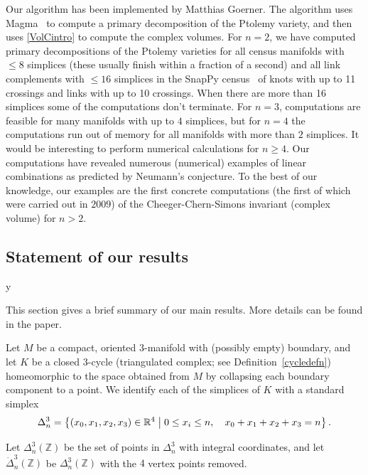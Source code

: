 \documentclass[11pt]{amsart}
\theoremstyle{definition}
\numberwithin{equation}{section}
\def\printname#1{
        \if\draft y
                \smash{\makebox[0pt]{\hspace{-0.5in}
                        \raisebox{8pt}{\tt\tiny #1}}}
        \fi
}
\def\lbl#1{\label{#1}\printname{#1}}
\newcommand{\R}{\mathbb R}
\newcommand{\Z}{\mathbb Z}
\begin{document}
Our algorithm has been implemented by Matthias Goerner. The algorithm uses 
Magma~\cite{Magma} to 
compute a primary decomposition of the Ptolemy variety, and then uses 
\eqref{VolCintro} 
to compute the complex volumes. %
For $n=2$, we have computed primary decompositions of the Ptolemy varieties for all census manifolds with 
$\leq 8$ simplices (these usually finish within a fraction of a second) and all link complements with $\leq 16$ simplices in the SnapPy census~\cite{SnapPy} of knots with up to 11 crossings and links with up to 10 crossings. 
When there are more than 16 simplices some of the computations don't terminate.
For $n=3$, computations are feasible for many manifolds with up to $4$ simplices, but for $n=4$ the computations run 
out of memory for all manifolds with more than $2$ simplices. It would be 
interesting to perform numerical calculations for $n \geq 4$. 
Our computations have revealed numerous (numerical) examples of linear 
combinations as predicted by Neumann's conjecture. 
To the best of our knowledge, our examples are the first concrete 
computations (the first of which were carried out in $2009$) of the Cheeger-Chern-Simons invariant (complex volume) 
for $n>2$.


\subsection{Statement of our results}
\lbl{sub.results}

This section gives a brief summary of our main results. More details can be 
found in the paper.

Let $M$ be a compact, oriented $3$-manifold with (possibly empty) boundary, 
and let $K$ be a closed $3$-cycle (triangulated complex; see 
Definition~\ref{cycledefn}) homeomorphic to the space obtained from $M$ by 
collapsing each boundary component to a point. We identify each of the 
simplices of $K$ with a standard simplex
\begin{equation}
\Delta^3_n=\left\{(x_0,x_1,x_2,x_3)\in\R^4\bigm \vert 0\leq x_i\leq n,
\quad x_0+x_1+x_2+x_3=n\right\}.
\end{equation}

Let $\Delta^3_n(\Z)$ be the set of points in $\Delta^3_n$ with integral coordinates, and let $\dot\Delta^3_n(\Z)$ be $\Delta^3_n(\Z)$ with the $4$ vertex points removed.
\end{document}
